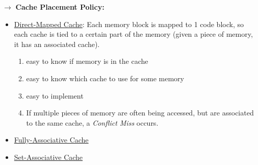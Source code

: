 \documentclass{report}
\begin{document}
    $\to$ \textbf{Cache Placement Policy:}
    \begin{itemize}
      \item \underline{Direct-Mapped Cache}: Each memory block is mapped to 1 code block, so each cache is tied to a certain part of the memory (given a piece of memory, it has an associated cache).
        \begin{enumerate}
          \item easy to know if memory is in the cache
          \item easy to know which cache to use for some memory
          \item easy to implement
          \item If multiple pieces of memory are often being accessed, but are associated to the same cache, a \emph{Conflict Miss} occurs.
        \end{enumerate}
      \item \underline{Fully-Associative Cache} 
      \item \underline{Set-Associative Cache} \\
    \end{itemize}

    
\end{document}
